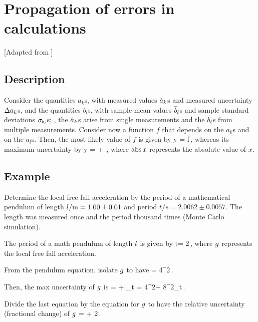 \chapter*{Propagation of errors in calculations}
%
[Adapted from \citep[p. 47]{oldenburg:2014}]


\newcommand{\period}{t}


\section*{Description}
%
Consider the quantities $a_k$s, with measured values $\mvalue a_k$s and measured uncertainty $\muncer a_k$s, and the quantities $b_l$s, with sample mean values $\smean b_l$s and sample standard deviations $\sstdev_{b_l}$s; \ie, the $\mvalue a_k$s arise from single measurements and the $\smean b_l$s from multiple measurements. Consider now a function $f$ that depends on the $a_k$s and on the $a_l$s. Then, the most likely value of $f$ is given by
%
\beq
    \mvalue y = f\,,
\eeq
%
whereas its maximum uncertainty by
%
\beq
    \muncer y =  + \,,
\eeq
%
where $\abs x$ represents the absolute value of $x$.


\section*{Example}
%
Determine the local free fall acceleration by the period of a mathematical pendulum of length $\length/\si{m} = 1.00 \pm 0.01$ and period $\period/\si{s} = 2.0062 \pm 0.0057$. The length was measured once and the period thousand times (Monte Carlo simulation).

The period of a math pendulum of length $\length$ is given by
%
\beq
    \period = 2\pi\sqrt{\dfrac{\length}{\grav}}\,,
\eeq
%
where $\grav$ represents the local free fall acceleration.

From the pendulum equation, isolate $\grav$ to have
%
\beq
    \grav = 4\pi^2\dfrac{\length}{\period}\,.
\eeq

Then, the max uncertainty of $\grav$ is
%
\beq
    \muncer\grav = \abs\ipd{\length}\grav\muncer\length + \abs\ipd{\period}\grav\sstdev_\period
                 = 4\pi^2\dfrac{1}{\period^2}\muncer\length + 8\pi^2\dfrac{\length}{\period^3}\sstdev_\period\,.
\eeq

Divide the last equation by the equation for $\grav$ to have the relative uncertainty (fractional change) of $\grav$
%
\beq
    \dfrac{\muncer\grav}{\grav} = \dfrac{\muncer\length}{\length} + 2\dfrac{\sstdev_\period}{\period}\,.
\eeq

